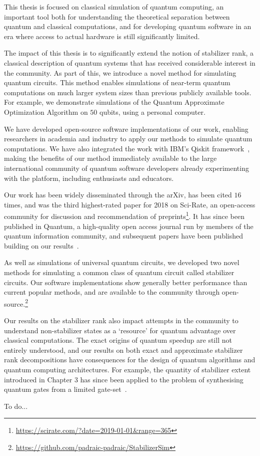 \begin{impactstatement}
This thesis is focused on classical simulation of quantum computing, an important tool both for understanding the theoretical separation between quantum and classical computations, and for developing quantum software in an era where access to actual hardware is still significantly limited.\par
The impact of this thesis is to significantly extend the notion of stabilizer rank, a classical description of quantum systems that has received considerable interest in the community. As part of this, we introduce a novel method for simulating quantum circuits. This method enables simulations of near-term quantum computations on much larger system sizes than previous publicly available tools. For example, we demonstrate simulations of the Quantum Approximate Optimization Algorithm on $50$ qubits, using a personal computer.\par
We have developed open-source software implementations of our work, enabling researchers in academia and industry to apply our methods to simulate quantum computations. We have also integrated the work with IBM's Qiskit framework~\cite{Qiskit}, making the benefits of our method immediately available to the large international community of quantum software developers already experimenting with the platform, including enthusiasts and educators.\par
Our work has been widely disseminated through the arXiv, has been cited $16$ times, and was the third highest-rated paper for 2018 on Sci-Rate, an open-access community for discussion and recommendation of preprints\footnote{\url{https://scirate.com/?date=2019-01-01&range=365}}. It has since been published in Quantum, a high-quality open access journal run by members of the quantum information community, and subsequent papers have been published building on our results~\cite{Qassim2019,Yifei2019}.\par
As well as simulations of universal quantum circuits, we developed two novel methods for simulating a common class of quantum circuit called stabilizer circuits. Our software implementations show generally better performance than current popular methods, and are available to the community through open-source.\footnote{\url{https://github.com/padraic-padraic/StabilizerSim}}\par
Our results on the stabilizer rank also impact attempts in the community to understand non-stabilizer states as a `resource' for quantum advantage over classical computations. The exact origins of quantum speedup are still not entirely understood, and our results on both exact and approximate stabilizer rank decompositions have consequences for the design of quantum algorithms and quantum computing architectures. For example, the quantity of stabilizer extent introduced in Chapter 3 has since been applied to the problem of synthesising quantum gates from a limited gate-set~\cite{Beverland2019}.
\end{impactstatement}

\begin{acknowledgements}
To do...
\end{acknowledgements}

\setcounter{tocdepth}{2} 

\tableofcontents

\printnomenclature


